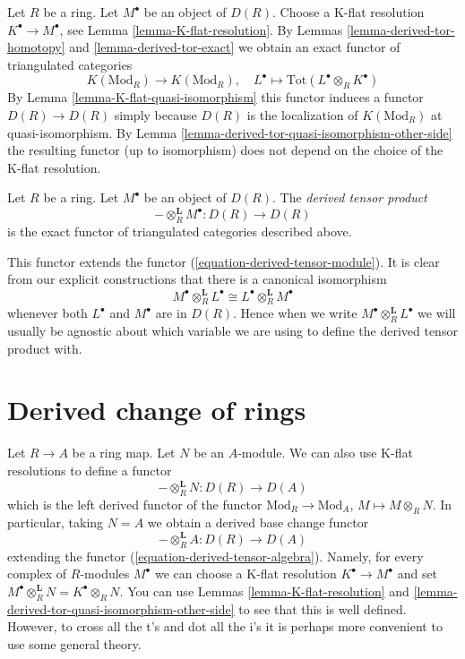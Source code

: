 \noindent
Let $R$ be a ring.
Let $M^\bullet$ be an object of $D(R)$.
Choose a K-flat resolution $K^\bullet \to M^\bullet$, see
Lemma \ref{lemma-K-flat-resolution}.
By
Lemmas \ref{lemma-derived-tor-homotopy} and \ref{lemma-derived-tor-exact}
we obtain an exact functor of triangulated categories
$$
K(\text{Mod}_R) \longrightarrow K(\text{Mod}_R), \quad
L^\bullet \longmapsto \text{Tot}(L^\bullet \otimes_R K^\bullet)
$$
By
Lemma \ref{lemma-K-flat-quasi-isomorphism}
this functor induces a functor $D(R) \to D(R)$ simply because
$D(R)$ is the localization of $K(\text{Mod}_R)$ at quasi-isomorphism.
By
Lemma \ref{lemma-derived-tor-quasi-isomorphism-other-side}
the resulting functor (up to isomorphism)
does not depend on the choice of the K-flat resolution.

\begin{definition}
\label{definition-derived-tor}
Let $R$ be a ring. Let $M^\bullet$ be an object of $D(R)$.
The {\it derived tensor product}
$$
- \otimes_R^{\mathbf{L}} M^\bullet : D(R) \longrightarrow D(R)
$$
is the exact functor of triangulated categories described above.
\end{definition}

\noindent
This functor extends the functor (\ref{equation-derived-tensor-module}).
It is clear from our explicit constructions that
there is a canonical isomorphism
$$
M^\bullet \otimes_R^{\mathbf{L}} L^\bullet
\cong
L^\bullet \otimes_R^{\mathbf{L}} M^\bullet
$$
whenever both $L^\bullet$ and $M^\bullet$ are in $D(R)$.
Hence when we write $M^\bullet \otimes_R^{\mathbf{L}} L^\bullet$
we will usually be agnostic about which variable we are using to
define the derived tensor product with.





\section{Derived change of rings}
\label{section-derived-base-change}

\noindent
Let $R \to A$ be a ring map. Let $N$ be an $A$-module. We can also use K-flat
resolutions to define a functor
$$
- \otimes_R^{\mathbf{L}} N : D(R) \to D(A)
$$
which is the left derived functor of the functor
$\text{Mod}_R \to \text{Mod}_A$, $M \mapsto M \otimes_R N$.
In particular, taking $N = A$ we obtain a derived base change functor
$$
- \otimes_R^{\mathbf{L}} A : D(R) \to D(A)
$$
extending the functor (\ref{equation-derived-tensor-algebra}).
Namely, for every complex of $R$-modules $M^\bullet$ we can
choose a K-flat resolution $K^\bullet \to M^\bullet$ and set
$M^\bullet \otimes_R^{\mathbf{L}} N = K^\bullet \otimes_R N$.
You can use
Lemmas \ref{lemma-K-flat-resolution} and
\ref{lemma-derived-tor-quasi-isomorphism-other-side}
to see that this is well defined. However, to cross all the t's and dot all
the i's it is perhaps more convenient to use some general theory.

